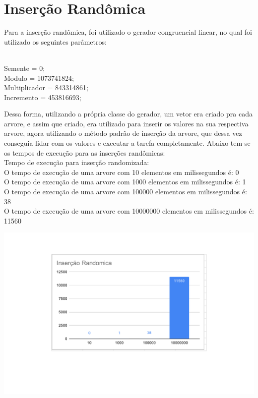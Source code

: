 \section{Inserção Randômica}

Para a inserção randômica, foi utilizado o gerador congruencial linear, no qual foi utilizado os seguintes parâmetros:
        \begin{center}
        \\Semente = 0;
        \\Modulo = 1073741824;
        \\Multiplicador = 843314861;
        \\Incremento = 453816693;
        \end{center}
Dessa forma, utilizando a própria classe do gerador, um vetor era criado pra cada arvore, e assim que criado, era utilizado para inserir os valores na sua respectiva arvore, agora utilizando o método padrão de inserção da arvore, que dessa vez conseguia lidar com os valores e executar a tarefa completamente. Abaixo tem-se os tempos de execução para as inserções randômicas:\\
Tempo de execução para inserção randomizada:\\
O tempo de execução de uma arvore com 10 elementos em milissegundos é: 0\\
O tempo de execução de uma arvore com 1000 elementos em milissegundos é: 1\\
O tempo de execução de uma arvore com 100000 elementos em milissegundos é: 38\\
O tempo de execução de uma arvore com 10000000 elementos em milissegundos é: 11560
    \begin{center}
            \includegraphics[scale=0.8]{Trabalho AED/fig/grafico3.pdf}
            \label{fig:Grafico 3}
    \end{center}
\pagebreak   
